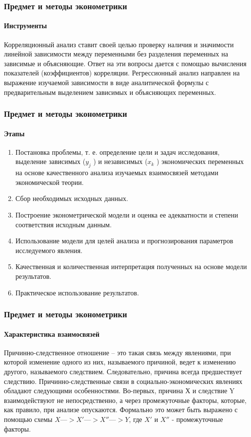 \documentclass[10pt,pdf,hyperref={unicode}]{beamer}
\begin{document}
\begin{frame}
\frametitle{Предмет и методы эконометрики} 
\framesubtitle{Инструменты}

Корреляционный анализ ставит своей целью проверку наличия и значимости 
линейной зависимости между переменными без разделения переменных на
зависимые и объясняющие. Ответ на эти вопросы дается с помощью вычисления 
показателей (коэффициентов) корреляции.
Регрессионный анализ направлен на выражение изучаемой зависимости в
виде аналитической формулы с предварительным выделением зависимых и
объясняющих переменных.

\end{frame}


\begin{frame}
\frametitle{Предмет и методы эконометрики} 
\framesubtitle{Этапы}

\begin{enumerate}
  \item  Постановка проблемы, т. е. определение цели и задач исследования, 
  выделение зависимых ($y_j$ ) и независимых ($x_k$ ) экономических переменных 
  на основе качественного анализа изучаемых взаимосвязей методами экономической теории.
  \item  Сбор необходимых исходных данных.
  \item  Построение эконометрической модели и оценка ее адекватности и степени соответствия исходным данным.
  \item  Использование модели для целей анализа и прогнозирования параметров исследуемого явления.
  \item  Качественная и количественная интерпретация полученных на основе
модели результатов.
  \item  Практическое использование результатов.
\end{enumerate}
\end{frame}


\begin{frame}
\frametitle{Предмет и методы эконометрики} 
\framesubtitle{Характеристика взаимосвязей}

Причинно-следственное отношение – это такая связь между явлениями,
при которой изменение одного из них, называемого причиной, ведет к изменению 
другого, называемого следствием. Следовательно, причина всегда предшествует следствию.
Причинно-следственные связи в социально-экономических явлениях обладают 
следующими особенностями. Во-первых, причина Х и следствие Y взаимодействуют 
не непосредственно, а через промежуточные факторы, которые,
как правило, при анализе опускаются. Формально это может быть выражено с
помощью схемы $X—>X'—>X''—>Y$, где $X'$ и $X''$ - промежуточные факторы.


\end{frame}
\end{document}
